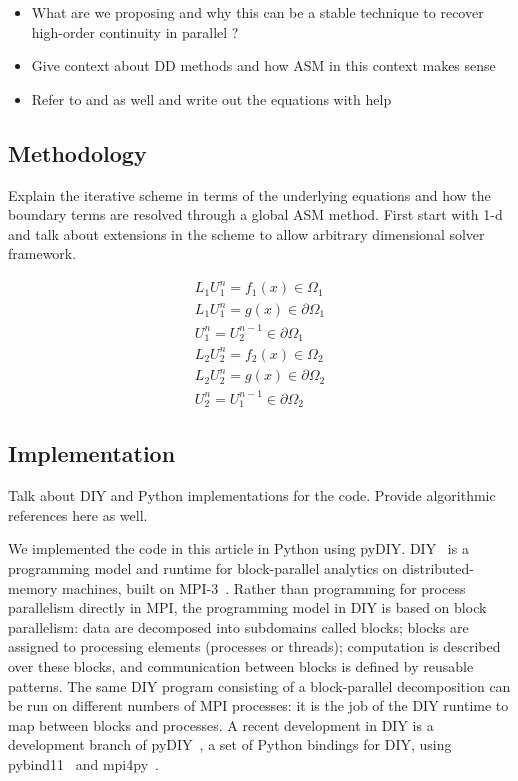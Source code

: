 \documentclass[conference]{IEEEtran}
\begin{document}
\begin{itemize}
	\item What are we proposing and why this can be a stable technique to recover high-order continuity in parallel ?
	\item Give context about DD methods and how ASM in this context makes sense 
	\item Refer to \cite{smith-ddm} and \cite{ddm-rbf-fast} as well and write out the equations with \cite{nurbs-book} help
\end{itemize}

\subsection{Methodology}

Explain the iterative scheme in terms of the underlying equations and how the boundary terms are resolved through a global ASM method. First start with 1-d and talk about extensions in the scheme to allow arbitrary dimensional solver framework.

\begin{eqnarray} \label{asm}
L_1U^{n}_1=f_1(x) \in \Omega_1  \\
L_1U^{n}_1=g(x) \in \partial\Omega_1 \\ 
U^{n}_1 = U^{n-1}_2 \in \partial\Omega_1 \\
L_2U^{n}_2=f_2(x) \in \Omega_2 \\
L_2U^{n}_2=g(x) \in \partial\Omega_2 \\
U^{n}_2 = U^{n-1}_1 \in \partial\Omega_2
\end{eqnarray}


\subsection{Implementation}

Talk about DIY and Python implementations for the code. Provide algorithmic references here as well.

We implemented the code in this article in Python using pyDIY. DIY~\cite{morozov16} is a programming model and runtime
for block-parallel analytics on distributed-memory machines, built on MPI-3~\cite{dongarra13}.  Rather than programming
for process parallelism directly in MPI, the programming model in DIY is based on block parallelism: data are decomposed
into subdomains called blocks; blocks are assigned to processing elements (processes or threads); computation is
described over these blocks, and communication between blocks is defined by reusable patterns. The same DIY program
consisting of a block-parallel decomposition can be run on different numbers of MPI processes: it is the job of the DIY
runtime to map between blocks and processes. A recent development in DIY is a development branch of pyDIY~\cite{pydiy},
a set of Python bindings for DIY, using pybind11~\cite{jakob17} and mpi4py~\cite{dalcin11}.
\end{document}
